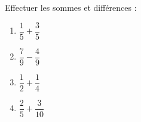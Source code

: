 
\begin{exercice}\label{exo2smath-0191}

    Effectuer les sommes et différences :
    \begin{multicols}{2}
        \begin{enumerate}
            \item
                \( \dfrac{ 1 }{5}+\dfrac{ 3 }{ 5 }\)
            \item
                \( \dfrac{ 7 }{ 9 }-\dfrac{ 4 }{ 9 }\)
            \item
                \( \dfrac{ 1 }{2}+\dfrac{ 1 }{ 4 }\)
            \item
                \( \dfrac{ 2 }{ 5 }+\dfrac{ 3 }{ 10 }\)
        \end{enumerate}
    \end{multicols}

\end{exercice}

